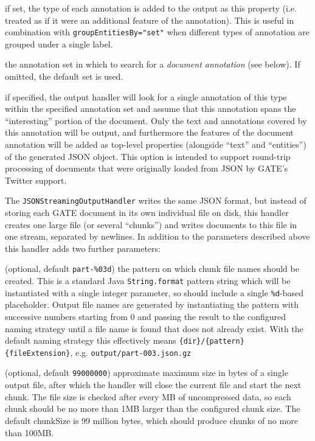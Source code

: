 \item[annotationTypeProperty] if set, the type of each annotation is added to
  the output as this property (i.e. treated as if it were an additional feature
  of the annotation).  This is useful in combination with
  \verb!groupEntitiesBy="set"! when different types of annotation are grouped
  under a single label.

\item[documentAnnotationASName] the annotation set in which to search for a
  \emph{document annotation} (see below).  If omitted, the default set is used.
\item[documentAnnotationType] if specified, the output handler will look for a
  single annotation of this type within the specified annotation set and assume
  that this annotation spans the ``interesting'' portion of the document.  Only
  the text and annotations covered by this annotation will be output, and
  furthermore the features of the document annotation will be added as
  top-level properties (alongside ``text'' and ``entities'') of the generated
  JSON object.  This option is intended to support round-trip processing of
  documents that were originally loaded from JSON by GATE's Twitter support.
\ede

The \verb!JSONStreamingOutputHandler! writes the same JSON format, but instead
of storing each GATE document in its own individual file on disk, this handler
creates one large file (or several ``chunks'') and writes documents to this
file in one stream, separated by newlines.  In addition to the parameters
described above this handler adds two further parameters:

\bde
\item[pattern] (optional, default \verb!part-%03d!) the pattern on which chunk
  file names should be created.  This is a standard Java \verb!String.format!
  pattern string which will be instantiated with a single integer parameter, so
  should include a single \verb!%d!-based placeholder.  Output file names are
  generated by instantiating the pattern with successive numbers starting from
  0 and passing the result to the configured naming strategy until a file name
  is found that does not already exist.  With the default naming strategy this
  effectively means \verb!{dir}/{pattern}{fileExtension}!, e.g.
  \verb!output/part-003.json.gz!
\item[chunkSize] (optional, default \verb!99000000!) approximate maximum size
  in bytes of a single output file, after which the handler will close the
  current file and start the next chunk.  The file size is checked after every MB
  of uncompressed data, so each chunk should be no more than 1MB larger than the
  configured chunk size.  The default chunkSize is 99 million bytes, which
  should produce chunks of no more than 100MB.
\ede

